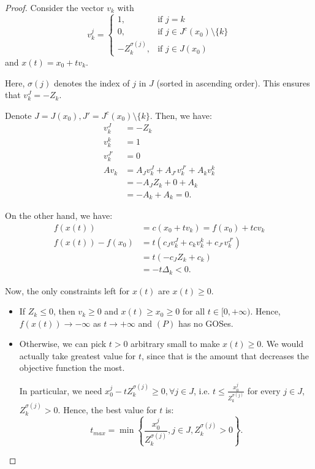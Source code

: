 \begin{proof}
  Consider the vector \( v_{k} \) with
  \[
    v^{j}_{k} = 
    \begin{cases}
      1, &\text{if } j = k\\
      0, &\text{if } j \in J^{c}(x_{0}) \setminus \{k\}  \\
      -Z^{\sigma(j)}_{k}, &\text{if } j \in J(x_{0})
    \end{cases}
  \] and \( x(t) = x_{0} + tv_{k} \).

  Here, \( \sigma(j) \) denotes the index of \( j \) in \( J \) (sorted in
  ascending order). This ensures
  that \( v^{J}_{k} = -Z_{k} \).

  Denote \( J = J(x_{0}), J' = J^{c}(x_{0}) \setminus \{k\}   \). Then, we have:
  \begin{align*}
    v_{k}^{J} &= -Z_{k}\\
    v^{k}_{k} &= 1\\
    v^{J' }_{k} &= 0 \\
    Av_{k} &= A_{J}v^{J}_{k} + A_{J'}v^{J'}_{k} + A_{k}v^{k}_{k} \\
    &= -A_{J}Z_{k} + 0 + A_{k} \\
    &= -A_{k} + A_{k} = 0
  .\end{align*}

  On the other hand, we have:
  \begin{align*}
    f(x(t)) &= c(x_{0} + tv_{k}) = f(x_{0}) + t cv_{k} \\
    f(x(t)) - f(x_{0}) &= t(c_{J}v^{J}_{k} + c_{k}v^{k}_{k} + c_{J'}v^{J'}_{k}) \\
    &= t(-c_{J}Z_{k} + c_{k} )\\
    &= -t\Delta_{k} < 0
  .\end{align*}

  Now, the only constraints left for \( x(t) \) are \( x(t) \ge 0 \).

  \begin{itemize}
  \item If \( Z_{k} \le  0 \), then \( v_{k} \ge 0 \) and \( x(t) \ge x_{0}
    \ge 0\) for all \( t \in [0, +\infty) \). Hence, \( f(x(t)) \to -\infty \)
    as \( t \to +\infty \) and \( (P) \) has no GOSes.

  \item Otherwise, we can pick \( t > 0 \) arbitrary small to make \( x(t) \ge 0
    \). We would actually take greatest value for \( t \), since that is the
    amount that decreases the objective function the most.

    In particular, we need \( x_{0}^{j} - tZ^{\sigma(j)}_{k} \ge 0, \forall j \in J \),
    i.e. \( t \le \frac{x_{0}^{j}}{Z^{\sigma(j)}_{k}} \) for every \( j \in J \), \(
    Z^{\sigma(j)}_{k} > 0 \). Hence, the best value for \( t \) is:
    \[
      t_{max} = \min \left\{  \frac{x^{j}_{0}}{Z^{\sigma(j)}_{k}}, j \in J,
        Z^{\sigma(j)}_{k} >
      0  \right\}
    .\] 
  \end{itemize}
\end{proof}

